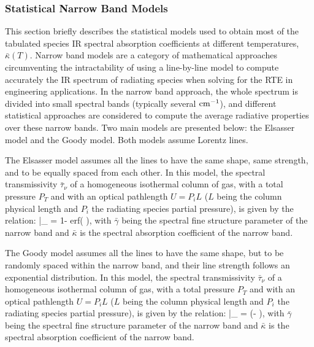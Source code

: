 \subsubsection{Statistical Narrow Band Models}
  This section briefly describes the statistical models used 
  to obtain most of the tabulated species IR spectral absorption coefficients
  at different temperatures, $\bar{\kappa}(T)$.
  Narrow band models are a category of mathematical approaches circumventing the intractability 
  of using a line-by-line model to compute accurately the IR spectrum of radiating species 
  when solving for the RTE in engineering applications.
  In the narrow band approach, the whole spectrum is divided into small spectral bands (typically several $\rm cm^{-1}$),
  and different statistical approaches are considered to compute the average radiative properties over these narrow bands.
  Two main models are presented below: the Elsasser model and the Goody model. Both models
  assume Lorentz lines.
 
  The Elsasser model assumes all the lines to have the same shape, same strength, and 
  to be equally spaced from each other. In this model, the spectral transmissivity $\bar{\tau}_{\nu}$
  of a homogeneous isothermal column of gas, with a total pressure $P_T$ and with an optical pathlength $U = P_i L$ 
  ($L$ being the column physical length and $P_i$ the radiating species partial pressure),
  is given by the relation:
  \be\label{eq::Elsasser}
    \bar{\tau}_{\nu} = 1- erf\left(\displaystyle{}  \right),
   \ee
  with $\bar{\gamma}$ being the spectral fine structure parameter of the narrow band
  and $\bar{\kappa}$ is the spectral absorption coefficient of the narrow band.

  The Goody model assumes all the lines to have the same
  shape, but to be randomly spaced within the narrow band,
  and their line strength follows an exponential distribution.
  In this model, the spectral transmissivity $\bar{\tau}_{\nu}$
  of a homogeneous isothermal column of gas, with a total pressure $P_T$ and with an optical pathlength $U = P_i L$ 
  ($L$ being the column physical length and $P_i$ the radiating species partial pressure),
  is given by the relation:
  \be\label{eq::Goody}
    \bar{\tau}_{\nu} = \exp\left(-\displaystyle{}
    {\displaystyle{}}\right),
  \ee
  with $\bar{\gamma}$ being the spectral fine structure parameter of the narrow band
  and $\bar{\kappa}$ is the spectral absorption coefficient of the narrow band.

